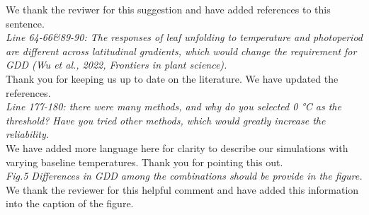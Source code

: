 \documentclass[11pt,a4paper]{article}\usepackage[]{graphicx}\usepackage[]{color}
\begin{document}
We thank the reviwer for this suggestion and have added references to this sentence. \\

\textit{Line 64-66&89-90: The responses of leaf unfolding to temperature and photoperiod are different across latitudinal gradients, which would change the requirement for GDD (Wu et al., 2022, Frontiers in plant science).} \\

Thank you for keeping us up to date on the literature. We have updated the references. \\

\textit{Line 177-180: there were many methods, and why do you selected 0 °C as the threshold? Have you tried other methods, which would greatly increase the reliability.} \\

We have added more language here for clarity to describe our simulations with varying baseline temperatures. Thank you for pointing this out. \\

\textit{Fig.5 Differences in GDD among the combinations should be provide in the figure.} \\

We thank the reviewer for this helpful comment and have added this information into the caption of the figure.


\newpage

\end{document}
